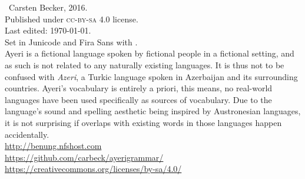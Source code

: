 
\begin{minipage}[b][\textheight][b]{0.67\textwidth}\small
\ccbysa~Carsten Becker, 2016.\\
Published under \textsc{cc-by-sa} 4.0 license.\\
Last edited: \today{}.\\[.5\baselineskip]

Set in Junicode and {\sffamily Fira Sans} with \XeTeX{}.\\[.5\baselineskip]

Ayeri is a fictional language spoken by fictional people in a fictional setting, and as such is not related to any naturally existing languages. It is thus not to be confused with \emph{Azeri}, a Turkic language spoken in Azerbaijan and its surrounding countries. Ayeri’s vocabulary is entirely a priori, this means, no real-world languages have been used specifically as sources of vocabulary. Due to the language’s sound and spelling aesthetic being inspired by Austronesian languages, it is not surprising if overlaps with existing words in those languages happen accidentally.\\[.5\baselineskip]

\href{http://benung.nfshost.com}{http://benung.nfshost.com}\\
\href{https://github.com/carbeck/ayerigrammar}{https://github.com/carbeck/ayerigrammar/}\\
\href{https://creativecommons.org/licenses/by-sa/4.0/}{https://creativecommons.org/licenses/by-sa/4.0/}%

\end{minipage}
